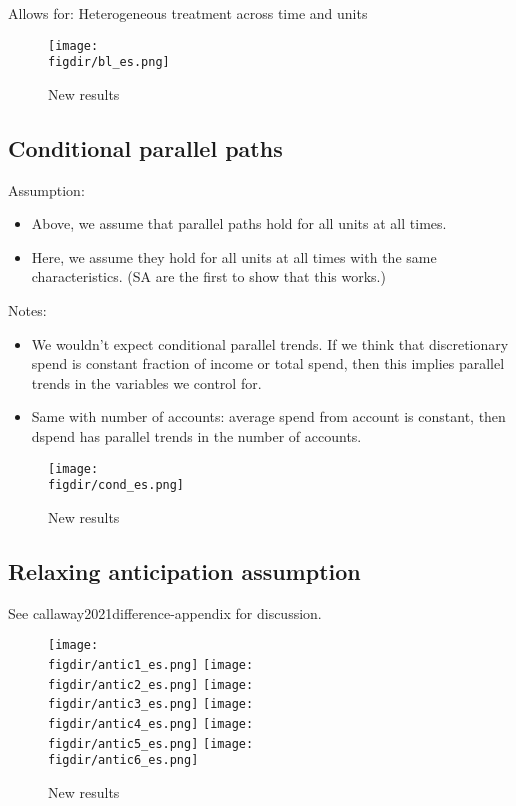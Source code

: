 Allows for: Heterogeneous treatment across time and units

\begin{figure}[H]
    \centering
    \caption{New results}%
    \label{fig:new}
    \texttt{[image: \\figdir/bl\_es.png]}
\end{figure}


\subsection{Conditional parallel paths}%
\label{sub:conditional_parallel_paths}

Assumption:
\begin{itemize}
    \item Above, we assume that parallel paths hold for all units at all times.
    \item Here, we assume they hold for all units at all times with the same
        characteristics. (SA are the first to show that this works.)
\end{itemize}

Notes:
\begin{itemize}
    \item We wouldn't expect conditional parallel trends. If we think that
        discretionary spend is constant fraction of income or total spend, then
        this implies parallel trends in the variables we control for.

    \item Same with number of accounts: average spend from account is constant,
        then dspend has parallel trends in the number of accounts.
\end{itemize}

\begin{figure}[H]
    \centering
    \caption{New results}%
    \label{fig:new}
    \texttt{[image: \\figdir/cond\_es.png]}
\end{figure}


\subsection{Relaxing anticipation assumption}%
\label{sub:relaxing_anticipation_assumption}

See callaway2021difference-appendix for discussion.

\begin{figure}[H]
    \centering
    \caption{New results}%
    \label{fig:new}
    \texttt{[image: \\figdir/antic1\_es.png]}
    \texttt{[image: \\figdir/antic2\_es.png]}
    \texttt{[image: \\figdir/antic3\_es.png]}
    \texttt{[image: \\figdir/antic4\_es.png]}
    \texttt{[image: \\figdir/antic5\_es.png]}
    \texttt{[image: \\figdir/antic6\_es.png]}
\end{figure}


